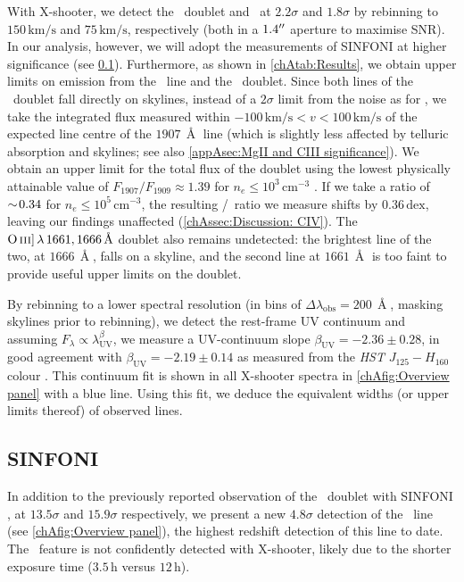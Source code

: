 With X-shooter, we detect the \OII\ doublet and \NeIII\ at $2.2 \sigma$ and $1.8 \sigma$ by rebinning to $150 \, \mathrm{km/s}$ and $75 \, \mathrm{km/s}$, respectively (both in a $1.4 \hbox{$^{\prime\prime}$}$ aperture to maximise SNR). In our analysis, however, we will adopt the measurements of SINFONI at higher significance (see \cref{chAssec:Results: SINFONI}). Furthermore, as shown in \cref{chAtab:Results}, we obtain upper limits on emission from the \HeII\ line and the \CIII\ doublet. Since both lines of the \CIII\ doublet fall directly on skylines, instead of a $2\sigma$ limit from the noise as for \HeII, we take the integrated flux measured within $-100 \, \mathrm{km/s} < v < 100 \, \mathrm{km/s}$ of the expected line centre of the $1907 \, \Angstrom$ line (which is slightly less affected by telluric absorption and skylines; see also \cref{appAsec:MgII and CIII significance}). We obtain an upper limit for the total flux of the doublet using the lowest physically attainable value of $F_{1907}/F_{1909} \approx 1.39$ for $n_e \leq 10^3 \, \mathrm{cm^{-3}}$ \citep{2019ApJ...880...16K}. If we take a ratio of $\sim \! 0.34$ for $n_e \leq 10^5 \, \mathrm{cm^{-3}}$, the resulting \CIV/\CIII\ ratio we measure shifts by $0.36 \, \mathrm{dex}$, leaving our findings unaffected (\cref{chAssec:Discussion: CIV}). The $\OIIIs \, \lambda \, 1661, 1666 \, \Angstrom$ doublet also remains undetected: the brightest line of the two, at $1666 \, \Angstrom$, falls on a skyline, and the second line at $1661 \, \Angstrom$ is too faint to provide useful upper limits on the doublet.

By rebinning to a lower spectral resolution (in bins of $\Delta \lambda_\text{obs} = 200 \, \Angstrom$, masking skylines prior to rebinning), we detect the rest-frame UV continuum and assuming $F_\lambda \propto \lambda^\beta_\text{UV}$, we measure a UV-continuum slope $\beta_\text{UV} = -2.36 \pm 0.28$, in good agreement with $\beta_\text{UV} = -2.19 \pm 0.14$ as measured from the \textit{HST} $J_{125} - H_{160}$ colour \citep{2017MNRAS.467.3306S}. This continuum fit is shown in all X-shooter spectra in \cref{chAfig:Overview panel} with a blue line. Using this fit, we deduce the equivalent widths (or upper limits thereof) of observed lines.

\subsection{SINFONI}
\label{chAssec:Results: SINFONI}

In addition to the previously reported observation of the \OII\ doublet with SINFONI \citep[\OII;][]{2007MNRAS.376..479S}, at $13.5 \sigma$ and $15.9 \sigma$ respectively, we present a new $4.8 \sigma$ detection of the \NeIII\ line (see \cref{chAfig:Overview panel}), the highest redshift detection of this line to date. The \NeIII\ feature is not confidently detected with X-shooter, likely due to the shorter exposure time ($3.5 \, \mathrm{h}$ versus $12 \, \mathrm{h}$).

